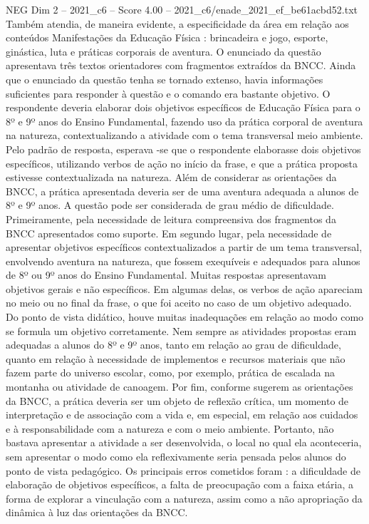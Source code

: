 \begin{textsample}{NEG Dim 2 – 2021\_c6 – Score 4.00 – 2021\_c6/enade\_2021\_ef\_be61acbd52.txt}
Também atendia, de maneira evidente, a especificidade da área em relação aos conteúdos Manifestações da Educação Física : brincadeira e jogo, esporte, ginástica, luta e práticas corporais de aventura.
O enunciado da questão apresentava três textos orientadores com fragmentos extraídos da BNCC.
Ainda que o enunciado da questão tenha se tornado extenso, havia informações suficientes para responder à questão e o comando era bastante objetivo.
O respondente deveria elaborar dois objetivos específicos de Educação Física para o 8º e 9º anos do Ensino Fundamental, fazendo uso da prática corporal de aventura na natureza, contextualizando a atividade com o tema transversal meio ambiente.
Pelo padrão de resposta, esperava -se que o respondente elaborasse dois objetivos específicos, utilizando verbos de ação no início da frase, e que a prática proposta estivesse contextualizada na natureza.
Além de considerar as orientações da BNCC, a prática apresentada deveria ser de uma aventura adequada a alunos de 8º e 9º anos.
A questão pode ser considerada de grau médio de dificuldade.
Primeiramente, pela necessidade de leitura compreensiva dos fragmentos da BNCC apresentados como suporte.
Em segundo lugar, pela necessidade de apresentar objetivos específicos contextualizados a partir de um tema transversal, envolvendo aventura na natureza, que fossem exequíveis e adequados para alunos de 8º ou 9º anos do Ensino Fundamental.
Muitas respostas apresentavam objetivos gerais e não específicos.
Em algumas delas, os verbos de ação apareciam no meio ou no final da frase, o que foi aceito no caso de um objetivo adequado.
Do ponto de vista didático, houve muitas inadequações em relação ao modo como se formula um objetivo corretamente.
Nem sempre as atividades propostas eram adequadas a alunos do 8º e 9º anos, tanto em relação ao grau de dificuldade, quanto em relação à necessidade de implementos e recursos materiais que não fazem parte do universo escolar, como, por exemplo, prática de escalada na montanha ou atividade de canoagem.
Por fim, conforme sugerem as orientações da BNCC, a prática deveria ser um objeto de reflexão crítica, um momento de interpretação e de associação com a vida e, em especial, em relação aos cuidados e à responsabilidade com a natureza e com o meio ambiente.
Portanto, não bastava apresentar a atividade a ser desenvolvida, o local no qual ela aconteceria, sem apresentar o modo como ela reflexivamente seria pensada pelos alunos do ponto de vista pedagógico.
Os principais erros cometidos foram : a dificuldade de elaboração de objetivos específicos, a falta de preocupação com a faixa etária, a forma de explorar a vinculação com a natureza, assim como a não apropriação da dinâmica à luz das orientações da BNCC.

\end{textsample}
